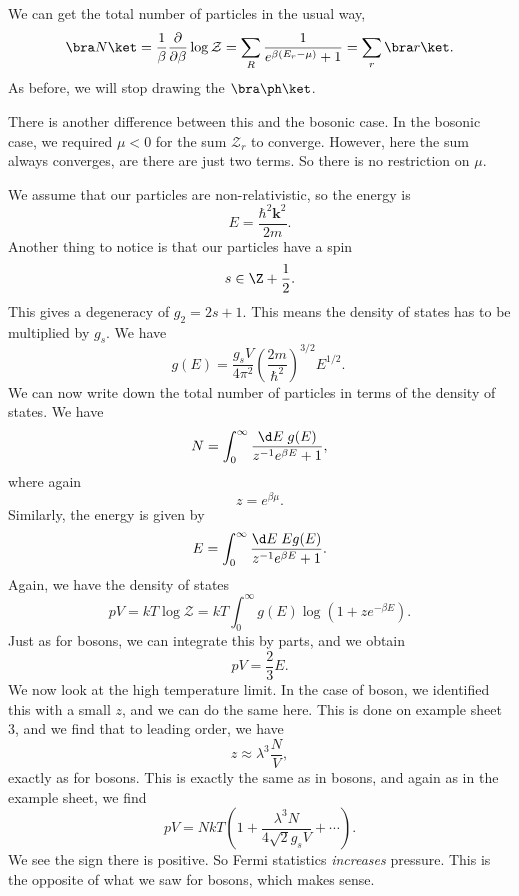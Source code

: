 \documentclass[a4paper]{article}
\begin{document}
We can get the total number of particles in the usual way,
\[
  \bra N\ket = \frac{1}{\beta} \frac{\partial}{\partial \beta}\log \mathcal{Z} = \sum_R \frac{1}{e^{\beta(E_r - \mu)} + 1} = \sum_r \bra r\ket.
\]
As before, we will stop drawing the $\bra \ph\ket$.

There is another difference between this and the bosonic case. In the bosonic case, we required $\mu < 0$ for the sum $\mathcal{Z}_r$ to converge. However, here the sum always converges, are there are just two terms. So there is no restriction on $\mu$.

We assume that our particles are non-relativistic, so the energy is
\[
  E = \frac{\hbar^2 \mathbf{k}^2}{2m}.
\]
Another thing to notice is that our particles have a spin
\[
  s \in \Z + \frac{1}{2}.
\]
This gives a degeneracy of $g_2 = 2s + 1$. This means the density of states has to be multiplied by $g_s$. We have
\[
  g(E) = \frac{g_s V}{4\pi^2} \left(\frac{2m}{\hbar^2}\right)^{3/2} E^{1/2}.\
\]
We can now write down the total number of particles in terms of the density of states. We have
\[
  N = \int_0^\infty \frac{\d E\; g(E)}{ z^{-1} e^{\beta E} + 1},
\]
where again
\[
  z = e^{\beta\mu}.
\]
Similarly, the energy is given by
\[
  E = \int_0^\infty \frac{\d E\; E g(E)}{z^{-1} e^{\beta E} + 1}.
\]
Again, we have the density of states
\[
  pV = kT \log \mathcal{Z} = kT \int_0^\infty g(E) \log (1 + z e^{-\beta E}).
\]
Just as for bosons, we can integrate this by parts, and we obtain
\[
  pV = \frac{2}{3} E.
\]
We now look at the high temperature limit. In the case of boson, we identified this with a small $z$, and we can do the same here. This is done on example sheet 3, and we find that to leading order, we have
\[
  z \approx \lambda^3 \frac{N}{V},
\]
exactly as for bosons. This is exactly the same as in bosons, and again as in the example sheet, we find
\[
  pV = NkT \left(1 + \frac{\lambda^3 N}{4 \sqrt{2} g_s V} + \cdots\right).
\]
We see the sign there is positive. So Fermi statistics \emph{increases} pressure. This is the opposite of what we saw for bosons, which makes sense.
\end{document}
